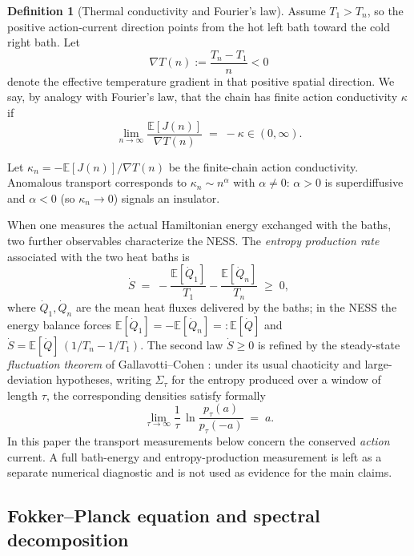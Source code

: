 \documentclass[11pt,a4paper]{article}
\theoremstyle{definition}
\newtheorem{definition}[theorem]{Definition}
\newcommand{\E}{\mathbb{E}}
\numberwithin{equation}{section}   %
\begin{document}
\begin{definition}[Thermal conductivity and Fourier's law]\label{de:fourier}
Assume $T_1>T_n$, so the positive action-current direction points from the hot
left bath toward the cold right bath. Let
\[
  \nabla T(n):=\frac{T_n-T_1}{n}<0
\]
denote the effective temperature gradient in that positive spatial direction.
We say, by analogy with Fourier's law, that the chain has finite action
conductivity $\kappa$ if
\begin{equation}\label{eq:fourier}
  \lim_{n \rightarrow \infty}\frac{\E[J(n)]}{\nabla T(n)} \;=\; -
  \kappa \in (0,\infty).
\end{equation}

Let $\kappa_n = -\E[J(n)]/\nabla T(n)$ be the finite-chain action
conductivity. Anomalous transport corresponds to $\kappa_n\sim n^{\alpha}$ with
$\alpha\neq0$:
$\alpha>0$ is superdiffusive and $\alpha<0$ (so $\kappa_n\to0$) signals an
insulator.
\end{definition}

When one measures the actual Hamiltonian energy exchanged with the baths, two
further observables characterize the NESS. The \emph{entropy production rate}
associated with the two heat baths is
\begin{equation}\label{eq:entropy-prod}
  \dot S \;=\; -\frac{\E[\dot Q_1]}{T_1} - \frac{\E[\dot Q_n]}{T_n} \;\ge\; 0,
\end{equation}
where $\dot Q_1,\dot Q_n$ are the mean heat fluxes delivered by the baths; in
the NESS the energy balance forces $\E[\dot Q_1]=-\E[\dot Q_n]=:\E[\dot Q]$ and
$\dot S = \E[\dot Q]\,(1/T_n - 1/T_1)$. The second law $\dot S\ge 0$ is refined
by the steady-state \emph{fluctuation theorem} of Gallavotti--Cohen
\cite{GallavottiCohen}: under its usual chaoticity and large-deviation
hypotheses, writing $\Sigma_\tau$ for the entropy produced over a window of
length $\tau$, the corresponding densities satisfy formally
\begin{equation}\label{eq:ft}
  \lim_{\tau\to\infty}\frac{1}{\tau}\,
  \ln\frac{p_\tau(a)}{p_\tau(-a)} \;=\; a .
\end{equation}
In this paper the transport measurements below concern the conserved
\emph{action} current. A full bath-energy and entropy-production measurement is
left as a separate numerical diagnostic and is not used as evidence for the
main claims.

\subsection{Fokker--Planck equation and spectral decomposition}\label{sec:fp}
\end{document}
